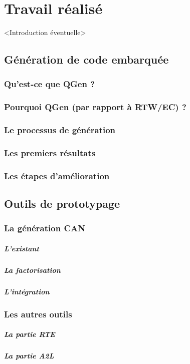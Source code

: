 \chapter{Travail réalisé}
<Introduction éventuelle>

\section{Génération de code embarquée}
\subsection{Qu'est-ce que QGen ?}
\subsection{Pourquoi QGen (par rapport à RTW/EC) ?}
\subsection{Le processus de génération}
\subsection{Les premiers résultats}
\subsection{Les étapes d'amélioration}

\section{Outils de prototypage}
\subsection{La génération CAN}
\paragraph{L'existant}
\paragraph{La factorisation}
\paragraph{L'intégration}
\subsection{Les autres outils}
\paragraph{La partie RTE}
\paragraph{La partie A2L}
